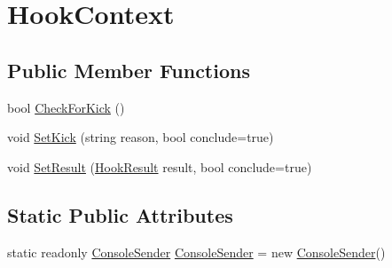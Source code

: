 \hypertarget{structOTA_1_1Plugin_1_1HookContext}{}\section{Hook\+Context}
\label{structOTA_1_1Plugin_1_1HookContext}
\subsection*{Public Member Functions}
\begin{DoxyCompactItemize}
\item 
bool \hyperlink{structOTA_1_1Plugin_1_1HookContext_ac543bf74f41e940bbdec97b125d6a116}{Check\+For\+Kick} ()
\item 
void \hyperlink{structOTA_1_1Plugin_1_1HookContext_ad551bfe070999af81016bd2d5f6ab1bd}{Set\+Kick} (string reason, bool conclude=true)
\item 
void \hyperlink{structOTA_1_1Plugin_1_1HookContext_ae4d59aad10c13a054ce864c7c016e8a4}{Set\+Result} (\hyperlink{namespaceOTA_1_1Plugin_a22f5f3f4da022b4336138cb37a5e4dfc}{Hook\+Result} result, bool conclude=true)
\end{DoxyCompactItemize}
\subsection*{Static Public Attributes}
\begin{DoxyCompactItemize}
\item 
static readonly \hyperlink{classOTA_1_1Command_1_1ConsoleSender}{Console\+Sender} \hyperlink{structOTA_1_1Plugin_1_1HookContext_aa3a762e8a7a9c25bd468df9f7097c1c5}{Console\+Sender} = new \hyperlink{classOTA_1_1Command_1_1ConsoleSender}{Console\+Sender}()
\end{DoxyCompactItemize}
